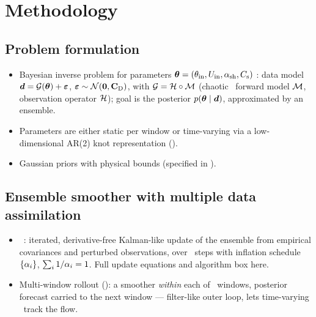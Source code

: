 \section{Methodology}\label{sec:methodology}


\subsection{Problem formulation}\label{sec:problem}
\begin{itemize}
  \item Bayesian inverse problem for parameters
        $\boldsymbol{\theta} = (\theta_{\mathrm{in}}, U_{\mathrm{in}}, \alpha_{\mathrm{sh}}, C_{\mathrm{s}})$
        \cite{kaipio2005statistical}: data model
        $\boldsymbol{d} = \mathcal{G}(\boldsymbol{\theta}) + \boldsymbol{\varepsilon}$,
        $\boldsymbol{\varepsilon} \sim \mathcal{N}(\boldsymbol{0}, \mathbf{C}_{\mathrm{D}})$, with
        $\mathcal{G} = \mathcal{H} \circ \mathcal{M}$ (chaotic \les\ forward model $\mathcal{M}$,
        observation operator $\mathcal{H}$); goal is the posterior
        $p(\boldsymbol{\theta} \mid \boldsymbol{d})$, approximated by an ensemble.
  \item Parameters are either static per window or time-varying via a
        low-dimensional AR(2) knot representation ().
  \item Gaussian priors with physical bounds (specified in ).
\end{itemize}

\subsection{Ensemble smoother with multiple data assimilation}\label{sec:esmda}
\begin{itemize}
  \item \esmda\ \cite{emerick2013esmda,evensen2018analysis}: iterated,
        derivative-free Kalman-like update of the ensemble from empirical
        covariances and perturbed observations, over \Na\ steps with inflation
        schedule $\{\alpha_{i}\}$, $\sum_i 1/\alpha_{i} = 1$. Full update equations and
        algorithm box here.
  \item Multi-window rollout (): a smoother
        \emph{within} each of \Nw\ windows, posterior forecast carried to the
        next window --- filter-like outer loop, lets time-varying \param\ track
        the flow.
\end{itemize}

